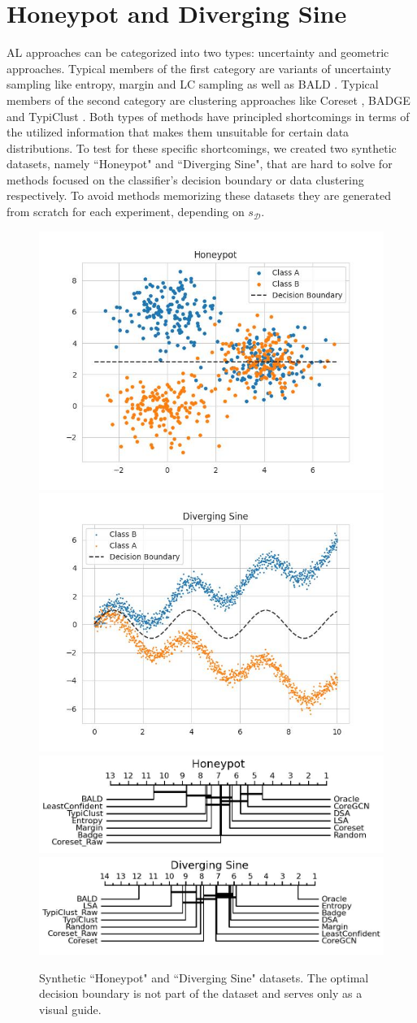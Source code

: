 \documentclass[]{article}
\newcommand{\D}{\mathcal{D}}
\begin{document}
\section{Honeypot and Diverging Sine}
AL approaches can be categorized into two types: uncertainty and geometric approaches.
Typical members of the first category are variants of uncertainty sampling like entropy, margin and LC sampling \cite{wang2014new} as well as BALD \cite{gal2017deep}.
Typical members of the second category are clustering approaches like Coreset \cite{sener2017active}, BADGE \cite{ashdeep} and TypiClust \cite{hacohen2022active}.
Both types of methods have principled shortcomings in terms of the utilized information that makes them unsuitable for certain data distributions. 
To test for these specific shortcomings, we created two synthetic datasets, namely ``Honeypot" and ``Diverging Sine", that are hard to solve for methods focused on the classifier's decision boundary or data clustering respectively. 
To avoid methods memorizing these datasets they are generated from scratch for each experiment, depending on $s_\D$. \\
\begin{figure}[]
	\centering
	\caption{Synthetic ``Honeypot" and ``Diverging Sine" datasets. The optimal decision boundary is not part of the dataset and serves only as a visual guide.}
	\label{fig:synth_results}
	\includegraphics[width=0.4\linewidth]{img/honeypot.jpg}
	\hspace{10mm}
	\includegraphics[width=0.4\linewidth]{img/diverging_sin.jpg}
	\includegraphics[width=0.49\linewidth]{img/micro_honeypot.jpg}
	\includegraphics[width=0.49\linewidth]{img/micro_diverging_sin.jpg}
	\vspace{-5mm}
\end{figure}
\end{document}
